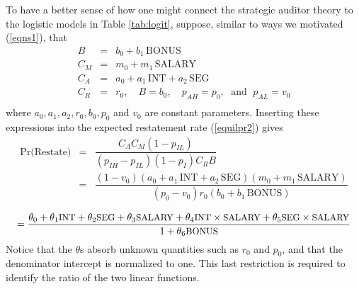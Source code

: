 To have a better sense of how one might connect the strategic auditor theory to the
logistic models in Table \ref{tab:logit}, suppose, similar to ways we motivated (\ref{eqns1}), that 
\begin{equation}\begin{array}{lcl}\label{eqns2}
B & = & b_0 + b_1 \, \mbox{BONUS} \\[.5em]
C_M & = & m_0 + m_1 \, \mbox{SALARY} \\[.5em]
C_A & = & a_0 + a_1 \, \mbox{INT} + a_2 \, \mbox{SEG}\\[.5em]
C_R & = & r_0, \quad B  =  b_0, \quad p_{AH}   =  p_0, \; \mbox{ and } \; p_{AL}  =  v_0 \\[.5em]
\end{array}
\end{equation}
where $ a_0, a_1, a_2, r_0, b_0, p_0$ and $v_0$ are constant parameters. 
Inserting these expressions into the expected restatement rate (\ref{equilpr2}) gives
\begin{equation*} \label{equilpr3}
\begin{array}{lcl}
\mbox{Pr(Restate)}& = &  \dfrac{C_AC_M(1-p_{IL})}{(p_{IH}-p_{IL})(1-p_I)C_RB}\\[2em]
& = & \dfrac{(1-v_0)(a_0 + a_1 \, \mbox{INT} + a_2 \, \mbox{SEG})(m_0 + m_1 \, \mbox{SALARY})}
{(p_0-v_0)r_0(b_0 + b_1 \, \mbox{BONUS})}\\[2em]
\end{array}
\end{equation*}
\begin{equation}\label{equilpr4}
 =  \dfrac{\theta_0 + \theta_1\mbox{\small INT} + \theta_2\mbox{\small SEG} + \theta_3\mbox{\small SALARY}
+ \theta_4\mbox{\small INT} \times \mbox{\small SALARY}+ \theta_5\mbox{\small SEG} \times \mbox{\small SALARY}}
{1 +  \theta_6\mbox{\small BONUS}}
\end{equation}
Notice that the $\theta$s absorb unknown quantities such as $r_0$ and $p_0$, and that the denominator intercept
is normalized to one. This last restriction is required to identify the ratio of the two linear functions.

